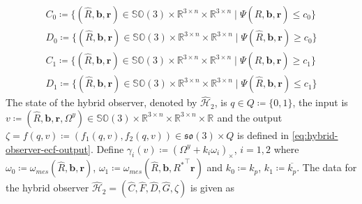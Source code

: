 \documentclass{article}
\newcommand{\SOthree}{\mathbb{SO}(3)}
\newcommand{\sothree}{\mathfrak{so}(3)}
\newcommand{\R}[1]{\mathbb{R}^{#1}}
\newcommand{\Omegay}{\Omega^y}
\newcommand{\Rstar}{{R^*}}
\begin{document}
\begin{subequations}
\begin{align}
    C_0 \coloneqq {\{(\hat{R}, \mathbf{b}, \mathbf{r})\in\SOthree\times \R{3\times n}\times \R{3\times n}\mid \Psi(\hat{R}, \mathbf{b}, \mathbf{r}) \leq c_0 \}}\\
    D_0 \coloneqq {\{(\hat{R}, \mathbf{b}, \mathbf{r})\in\SOthree\times \R{3\times n}\times \R{3\times n}\mid \Psi(\hat{R}, \mathbf{b}, \mathbf{r}) \geq c_0 \}}\\
    C_1 \coloneqq {\{(\hat{R}, \mathbf{b}, \mathbf{r})\in\SOthree\times \R{3\times n}\times \R{3\times n}\mid \Psi(\hat{R}, \mathbf{b}, \mathbf{r}) \geq c_1 \}}\\
    D_1 \coloneqq {\{(\hat{R}, \mathbf{b}, \mathbf{r})\in\SOthree\times \R{3\times n}\times \R{3\times n}\mid \Psi(\hat{R}, \mathbf{b}, \mathbf{r}) \leq c_1\}}
\end{align}
\end{subequations}
The state of the hybrid observer, denoted by $\hat{\mathcal{H}}_2$, is $q\in Q\coloneqq \{0, 1\}$, the input is $v \coloneqq (\hat{R}, \mathbf{b}, \mathbf{r}, \Omegay)\in \SOthree\times \R{3\times n}\times \R{3\times n} \times \R{}$ and the output $\zeta=f(q,v)\coloneqq (f_1(q,v), f_2(q,v))\in\sothree\times Q$ is defined in \eqref{eq:hybrid-observer-ecf-output}. Define $\gamma_i(v) \coloneqq (\Omegay + k_i\omega_i)_\times$, $i=1,2$ where $\omega_0 \coloneqq \omega_{mes}(\hat{R}, \mathbf{b}, \mathbf{r})$, $\omega_1 \coloneqq \omega_{mes}(\hat{R}, \mathbf{b}, \Rstar^\top\mathbf{r})$ and $k_0 \coloneqq k_p$, $k_1\coloneqq \overline{k_p}$. The data for the hybrid observer $\hat{\mathcal{H}}_2 = ({\hat{C}, \hat{F}, \hat{D}, \hat{G}, \zeta})$ is given as 
\end{document}
